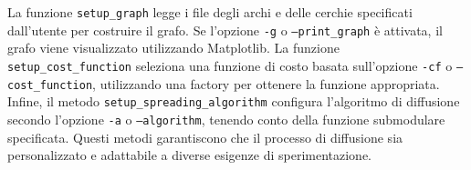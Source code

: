 La funzione \texttt{setup_graph} legge i file degli archi e delle cerchie specificati dall'utente per costruire il grafo. Se l'opzione \texttt{-g} o \texttt{--print_graph} è attivata, il grafo viene visualizzato utilizzando Matplotlib. La funzione \texttt{setup_cost_function} seleziona una funzione di costo basata sull'opzione \texttt{-cf} o \texttt{--cost_function}, utilizzando una factory per ottenere la funzione appropriata. Infine, il metodo \texttt{setup_spreading_algorithm} configura l'algoritmo di diffusione secondo l'opzione \texttt{-a} o \texttt{--algorithm}, tenendo conto della funzione submodulare specificata. Questi metodi garantiscono che il processo di diffusione sia personalizzato e adattabile a diverse esigenze di sperimentazione.

